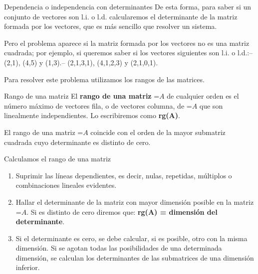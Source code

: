 \documentclass[11pt,a4paper]{article}
\newcommand{\fmm}[1]{\setbox0=\hbox{$#1$}\ifdim\wd0>\linewidth\fmdisp{#1}\else\mbox{\box0}\fi}
\newcommand{\fmdisp}[1]{\[\setbox2=\hbox{$\displaystyle #1$}\ifdim\wd2>\linewidth\resizebox{\linewidth}{!}{\box2}\else\box2\fi\]}
\begin{document}
\begin{fmprop}{Dependencia o independencia con determinantes}
De esta forma, para saber si un conjunto de vectores son l.i. o l.d. calcularemos el determinante de la matriz formada por los vectores, que es más sencillo que resolver un sistema.

Pero el problema aparece si la matriz formada por los vectores no es una matriz cuadrada; por ejemplo, si queremos saber si los vectores siguientes son l.i. o l.d.:\newline -- (2,1), (4,5) y (1,3).\newline -- (2,1,3,1), (4,1,2,3) y (2,1,0,1).

Para resolver este problema utilizamos los rangos de las matrices.
\end{fmprop}

\begin{fmdef}{Rango de una matriz}
El \textbf{rango de una matriz} \fmm{A} de cualquier orden es el número máximo de vectores fila, o de vectores columna, de \fmm{A} que son linealmente independientes. Lo escribiremos como \textbf{rg(A)}.

\begin{fmnote}El rango de una matriz \fmm{A} coincide con el orden de la mayor submatriz cuadrada cuyo determinante es distinto de cero.\end{fmnote}
\end{fmdef}

\begin{fmprop}{Calculamos el rango de una matriz}
\begin{enumerate}
\item Suprimir las líneas dependientes, es decir, nulas, repetidas, múltiplos o combinaciones lineales evidentes.
\item Hallar el determinante de la matriz con mayor dimensión posible en la matriz \fmm{A}. Si es distinto de cero diremos que: \textbf{rg(A) = dimensión del determinante}.
\item Si el determinante es cero, se debe calcular, si es posible, otro con la misma dimensión. Si se agotan todas las posibilidades de una determinada dimensión, se calculan los determinantes de las submatrices de una dimensión inferior.
\end{enumerate}
\end{fmprop}
\end{document}
